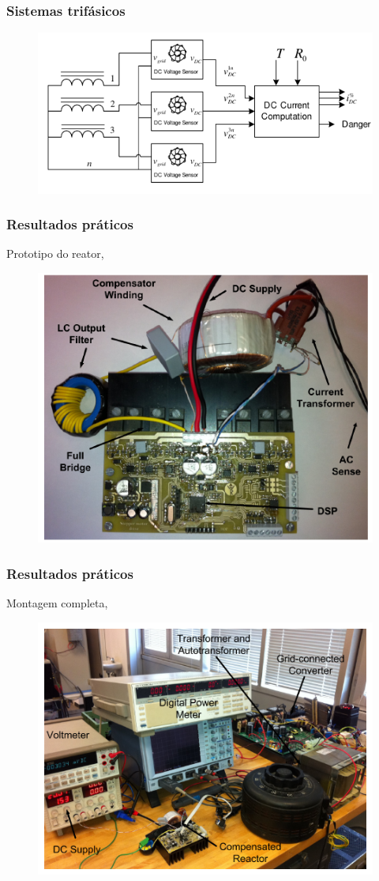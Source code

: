 \documentclass{beamer}
\begin{document}
\begin{frame}
    \frametitle{Sistemas trifásicos}


    \begin{figure}
        \includegraphics[width=.8\linewidth]{fig10.png}
    \end{figure}
\end{frame}

\begin{frame}
    \frametitle{Resultados práticos}
    
    Prototipo do reator,
    \begin{figure}
        \includegraphics[width=.8\linewidth]{fig11.png}
    \end{figure}
\end{frame}

\begin{frame}
    \frametitle{Resultados práticos}

    Montagem completa,
    \begin{figure}
        \includegraphics[width=.8\linewidth]{fig13.png}
    \end{figure}
\end{frame}
\end{document}

